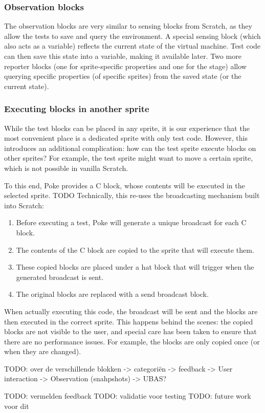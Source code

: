 \documentclass[../main]{subfiles}
\begin{document}
\subsubsection{Observation blocks}

The observation blocks are very similar to sensing blocks from Scratch, as they allow the tests to save and query the environment.
A special sensing block (which also acts as a variable) reflects the current state of the virtual machine.
Test code can then save this state into a variable, making it available later.
Two more reporter blocks (one for sprite-specific properties and one for the stage) allow querying specific properties (of specific sprites) from the saved state (or the current state).

\subsubsection{Executing blocks in another sprite}

While the test blocks can be placed in any sprite, it is our experience that the most convenient place is a dedicated sprite with only test code.
However, this introduces an additional complication: how can the test sprite execute blocks on other sprites?
For example, the test sprite might want to move a certain sprite, which is not possible in vanilla Scratch.

To this end, Poke provides a C block, whose contents will be executed in the selected sprite.
TODO
Technically, this re-uses the broadcasting mechanism built into Scratch:

\begin{enumerate}
    \item Before executing a test, Poke will generate a unique broadcast for each C block.
    \item The contents of the C block are copied to the sprite that will execute them.
    \item These copied blocks are placed under a hat block that will trigger when the generated broadcast is sent.
    \item The original blocks are replaced with a send broadcast block.
\end{enumerate}

When actually executing this code, the broadcast will be sent and the blocks are then executed in the correct sprite.
This happens behind the scenes: the copied blocks are not visible to the user, and special care has been taken to ensure that there are no performance issues.
For example, the blocks are only copied once (or when they are changed).




TODO: over de verschillende blokken
-> categoriën
-> feedback
-> User interaction
-> Observation (snahpshots)
-> UBAS?

TODO: vermelden feedback
TODO: validatie voor testing
TODO: future work voor dit

\end{document}

